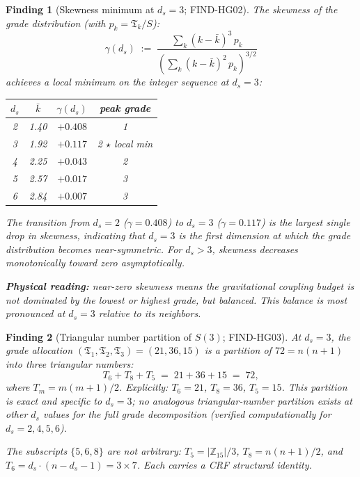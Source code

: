 \documentclass[12pt, a4paper]{article}
\newtheorem{finding}{Finding}[section]
\begin{document}
\begin{finding}[Skewness minimum at $d_s = 3$; FIND-HG02]
\label{find:skewness}
The skewness of the grade distribution (with $p_k =
\mathfrak{T}_k / S$):
\begin{equation}
  \gamma(d_s) \;:=\;
  \frac{\sum_{k} (k - \bar{k})^3\, p_k}
       {\left(\sum_{k} (k - \bar{k})^2\, p_k\right)^{3/2}}
\end{equation}
achieves a local minimum on the integer sequence at $d_s = 3$:

\begin{center}
{\small
\renewcommand{\arraystretch}{1.20}
\begin{tabular}{cccc}
\toprule
$d_s$ & $\bar{k}$ & $\gamma(d_s)$ & peak grade \\
\midrule
2 & 1.40 & $+0.408$ & 1 \\
3 & 1.92 & $\mathbf{+0.117}$ & 2 \quad $\star$ local min \\
4 & 2.25 & $+0.043$ & 2 \\
5 & 2.57 & $+0.017$ & 3 \\
6 & 2.84 & $+0.007$ & 3 \\
\bottomrule
\end{tabular}
}
\end{center}

The transition from $d_s = 2$ ($\gamma = 0.408$) to $d_s = 3$
($\gamma = 0.117$) is the largest single drop in skewness,
indicating that $d_s = 3$ is the first dimension at which the
grade distribution becomes near-symmetric. For $d_s > 3$,
skewness decreases monotonically toward zero asymptotically.

\textbf{Physical reading:} near-zero skewness means the gravitational
coupling budget is not dominated by the lowest or highest grade,
but balanced. This balance is most pronounced at $d_s = 3$
relative to its neighbors.
\end{finding}

\begin{finding}[Triangular number partition of $S(3)$; FIND-HG03]
\label{find:triangular}
At $d_s = 3$, the grade allocation
$(\mathfrak{T}_1, \mathfrak{T}_2, \mathfrak{T}_3) = (21, 36, 15)$
is a partition of $72 = n(n+1)$ into three triangular numbers:
\begin{equation}
  T_6 + T_8 + T_5 \;=\; 21 + 36 + 15 \;=\; 72,
  \label{eq:triangular-partition}
\end{equation}
where $T_m = m(m+1)/2$. Explicitly: $T_6 = 21$, $T_8 = 36$,
$T_5 = 15$. This partition is exact and specific to $d_s = 3$;
no analogous triangular-number partition exists at other $d_s$
values for the full grade decomposition (verified computationally
for $d_s = 2, 4, 5, 6$).

The subscripts $\{5, 6, 8\}$ are not arbitrary: $T_5 =
|\mathbb{Z}_{15}|/3$, $T_8 = n(n+1)/2$, and $T_6 =
d_s \cdot (n - d_s - 1) = 3 \times 7$. Each carries a CRF
structural identity.
\end{finding}
\end{document}
